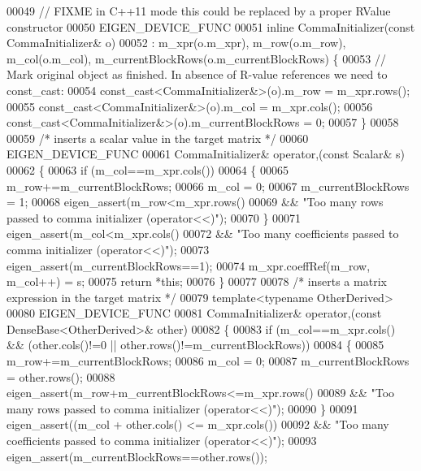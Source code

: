 \begin{DoxyCode}
00049   \textcolor{comment}{// FIXME in C++11 mode this could be replaced by a proper RValue constructor}
00050   EIGEN\_DEVICE\_FUNC
00051   \textcolor{keyword}{inline} CommaInitializer(\textcolor{keyword}{const} CommaInitializer& o)
00052   : m\_xpr(o.m\_xpr), m\_row(o.m\_row), m\_col(o.m\_col), m\_currentBlockRows(o.m\_currentBlockRows) \{
00053     \textcolor{comment}{// Mark original object as finished. In absence of R-value references we need to const\_cast:}
00054     \textcolor{keyword}{const\_cast<}CommaInitializer&\textcolor{keyword}{>}(o).m\_row = m\_xpr.rows();
00055     \textcolor{keyword}{const\_cast<}CommaInitializer&\textcolor{keyword}{>}(o).m\_col = m\_xpr.cols();
00056     \textcolor{keyword}{const\_cast<}CommaInitializer&\textcolor{keyword}{>}(o).m\_currentBlockRows = 0;
00057   \}
00058 
00059   \textcolor{comment}{/* inserts a scalar value in the target matrix */}
00060   EIGEN\_DEVICE\_FUNC
00061   CommaInitializer& operator,(\textcolor{keyword}{const} Scalar& s)
00062   \{
00063     \textcolor{keywordflow}{if} (m\_col==m\_xpr.cols())
00064     \{
00065       m\_row+=m\_currentBlockRows;
00066       m\_col = 0;
00067       m\_currentBlockRows = 1;
00068       eigen\_assert(m\_row<m\_xpr.rows()
00069         && \textcolor{stringliteral}{"Too many rows passed to comma initializer (operator<<)"});
00070     \}
00071     eigen\_assert(m\_col<m\_xpr.cols()
00072       && \textcolor{stringliteral}{"Too many coefficients passed to comma initializer (operator<<)"});
00073     eigen\_assert(m\_currentBlockRows==1);
00074     m\_xpr.coeffRef(m\_row, m\_col++) = s;
00075     \textcolor{keywordflow}{return} *\textcolor{keyword}{this};
00076   \}
00077 
00078   \textcolor{comment}{/* inserts a matrix expression in the target matrix */}
00079   \textcolor{keyword}{template}<\textcolor{keyword}{typename} OtherDerived>
00080   EIGEN\_DEVICE\_FUNC
00081   CommaInitializer& operator,(\textcolor{keyword}{const} DenseBase<OtherDerived>& other)
00082   \{
00083     \textcolor{keywordflow}{if} (m\_col==m\_xpr.cols() && (other.cols()!=0 || other.rows()!=m\_currentBlockRows))
00084     \{
00085       m\_row+=m\_currentBlockRows;
00086       m\_col = 0;
00087       m\_currentBlockRows = other.rows();
00088       eigen\_assert(m\_row+m\_currentBlockRows<=m\_xpr.rows()
00089         && \textcolor{stringliteral}{"Too many rows passed to comma initializer (operator<<)"});
00090     \}
00091     eigen\_assert((m\_col + other.cols() <= m\_xpr.cols())
00092       && \textcolor{stringliteral}{"Too many coefficients passed to comma initializer (operator<<)"});
00093     eigen\_assert(m\_currentBlockRows==other.rows());

\end{DoxyCode}
